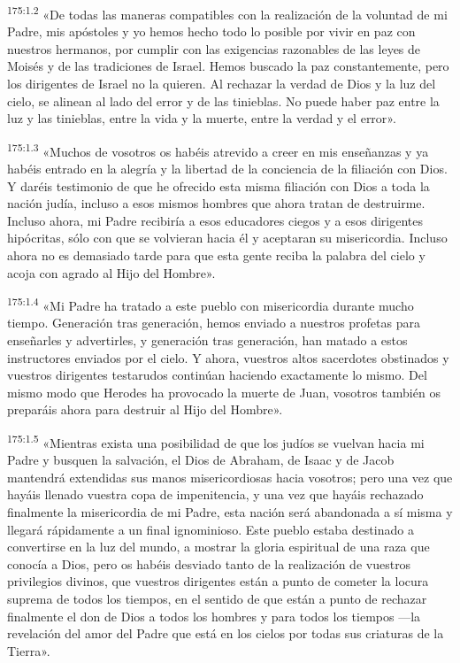 \par 
\textsuperscript{175:1.2} «De todas las maneras compatibles con la realización de la voluntad de mi Padre, mis apóstoles y yo hemos hecho todo lo posible por vivir en paz con nuestros hermanos, por cumplir con las exigencias razonables de las leyes de Moisés y de las tradiciones de Israel. Hemos buscado la paz constantemente, pero los dirigentes de Israel no la quieren. Al rechazar la verdad de Dios y la luz del cielo, se alinean al lado del error y de las tinieblas. No puede haber paz entre la luz y las tinieblas, entre la vida y la muerte, entre la verdad y el error».

\par 
\textsuperscript{175:1.3} «Muchos de vosotros os habéis atrevido a creer en mis enseñanzas y ya habéis entrado en la alegría y la libertad de la conciencia de la filiación con Dios. Y daréis testimonio de que he ofrecido esta misma filiación con Dios a toda la nación judía, incluso a esos mismos hombres que ahora tratan de destruirme. Incluso ahora, mi Padre recibiría a esos educadores ciegos y a esos dirigentes hipócritas, sólo con que se volvieran hacia él y aceptaran su misericordia. Incluso ahora no es demasiado tarde para que esta gente reciba la palabra del cielo y acoja con agrado al Hijo del Hombre».

\par 
\textsuperscript{175:1.4} «Mi Padre ha tratado a este pueblo con misericordia durante mucho tiempo. Generación tras generación, hemos enviado a nuestros profetas para enseñarles y advertirles, y generación tras generación, han matado a estos instructores enviados por el cielo. Y ahora, vuestros altos sacerdotes obstinados y vuestros dirigentes testarudos continúan haciendo exactamente lo mismo. Del mismo modo que Herodes ha provocado la muerte de Juan, vosotros también os preparáis ahora para destruir al Hijo del Hombre».

\par 
\textsuperscript{175:1.5} «Mientras exista una posibilidad de que los judíos se vuelvan hacia mi Padre y busquen la salvación, el Dios de Abraham, de Isaac y de Jacob mantendrá extendidas sus manos misericordiosas hacia vosotros; pero una vez que hayáis llenado vuestra copa de impenitencia, y una vez que hayáis rechazado finalmente la misericordia de mi Padre, esta nación será abandonada a sí misma y llegará rápidamente a un final ignominioso. Este pueblo estaba destinado a convertirse en la luz del mundo, a mostrar la gloria espiritual de una raza que conocía a Dios, pero os habéis desviado tanto de la realización de vuestros privilegios divinos, que vuestros dirigentes están a punto de cometer la locura suprema de todos los tiempos, en el sentido de que están a punto de rechazar finalmente el don de Dios a todos los hombres y para todos los tiempos ---la revelación del amor del Padre que está en los cielos por todas sus criaturas de la Tierra».

